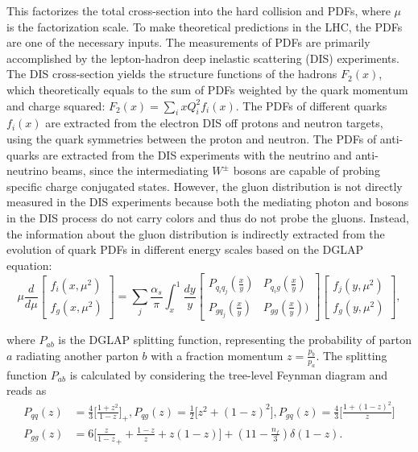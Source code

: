 \noindent This factorizes the total cross-section into the hard collision and PDFs, where $\mu$ is the factorization scale. To make theoretical predictions in the LHC, the PDFs are one of the necessary inputs. The measurements of PDFs are primarily accomplished by the lepton-hadron deep inelastic scattering (DIS) experiments. The DIS cross-section yields the structure functions of the hadrons $F_2(x)$, which theoretically equals to the sum of PDFs weighted by the quark momentum and charge squared: $F_2(x) = \sum_i x Q^2_i f_i(x)$. The PDFs of different quarks $f_i(x)$ are extracted from the electron DIS off protons and neutron targets, using the quark symmetries between the proton and neutron. The PDFs of anti-quarks are extracted from the DIS experiments with the neutrino and anti-neutrino beams, since the intermediating $W^\pm$ bosons are capable of probing specific charge conjugated states. However, the gluon distribution is not directly measured in the DIS experiments because both the mediating photon and \PW bosons in the DIS process do not carry colors and thus do not probe the gluons. Instead, the information about the gluon distribution is indirectly extracted from the evolution of quark PDFs in different energy scales based on the DGLAP equation:
\begin{equation}
    \mu \frac{d}{d\mu} \begin{bmatrix} f_i(x,\mu^2) \\ f_g(x,\mu^2) \end{bmatrix} = 
    \sum_j \frac{\alpha_s}{\pi} \int_x^1 
    \frac{dy}{y}
    \begin{bmatrix} P_{q_i q_j}(\frac{x}{y}) & P_{q_i g}(\frac{x}{y}) \\ P_{g q_j}(\frac{x}{y}) & P_{gg}(\frac{x}{y})) \end{bmatrix} \begin{bmatrix} f_j(y,\mu^2) \\ f_g(y, \mu^2) \end{bmatrix} ,
    \label{eqn:relatedWorks:qft:ppCollision:dglap}
\end{equation}

\noindent where $P_{ab}$ is the DGLAP splitting function, representing the probability of parton $a$ radiating another parton $b$ with a fraction momentum $z=\frac{p_b}{p_a}$. The splitting  function $P_{ab}$ is calculated by considering the tree-level Feynman diagram and reads as
\begin{equation}
\begin{split}
	P_{qq}(z) &= \frac{4}{3}\bigg[\frac{1+z^2}{1-z} \bigg]_+, P_{qg}(z)=\frac{1}{2} \bigg[z^2+(1-z)^2 \bigg], P_{gq}(z)=\frac{4}{3}\bigg[\frac{1+(1-z)^2}{z} \bigg]\\
    P_{gg}(z) &= 6 \bigg[ \frac{z}{1-z}_+ + \frac{1-z}{z} + z(1-z) \bigg] +(11-\frac{n_f}{3})\delta(1-z) .
\end{split}
\label{eqn:relatedWorks:qft:ppCollision:splitting}
\end{equation}

